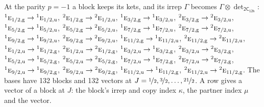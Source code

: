 \documentclass[10pt,a4paper]{article}
\numberwithin{equation}{section}
\newcommand{\grp}[1]{\mathsf{#1}}
\newcommand{\irr}[1]{\text{\normalfont\scshape #1}}
\newcommand{\conjpair}[1]{{}^{#1}}
\newcommand{\ptag}[1]{\mathrm{#1}}
\newcommand{\irrprod}{\otimes}
\newcommand{\mult}{\kappa}
\newcommand{\intx}{\mu}
\begin{document}
At the parity $p = -1$ a block keeps its kets, and its irrep $\Gamma$ becomes $\Gamma \irrprod \det_{\grp{2C_{12h}}}$: $\conjpair{1}\irr{e}_{1/2,\ptag{g}} \to \conjpair{1}\irr{e}_{1/2,\ptag{u}}$, $\conjpair{2}\irr{e}_{1/2,\ptag{g}} \to \conjpair{2}\irr{e}_{1/2,\ptag{u}}$, $\conjpair{1}\irr{e}_{3/2,\ptag{g}} \to \conjpair{1}\irr{e}_{3/2,\ptag{u}}$, $\conjpair{2}\irr{e}_{3/2,\ptag{g}} \to \conjpair{2}\irr{e}_{3/2,\ptag{u}}$, $\conjpair{1}\irr{e}_{5/2,\ptag{g}} \to \conjpair{1}\irr{e}_{5/2,\ptag{u}}$, $\conjpair{2}\irr{e}_{5/2,\ptag{g}} \to \conjpair{2}\irr{e}_{5/2,\ptag{u}}$, $\conjpair{1}\irr{e}_{7/2,\ptag{g}} \to \conjpair{1}\irr{e}_{7/2,\ptag{u}}$, $\conjpair{2}\irr{e}_{7/2,\ptag{g}} \to \conjpair{2}\irr{e}_{7/2,\ptag{u}}$, $\conjpair{1}\irr{e}_{9/2,\ptag{g}} \to \conjpair{1}\irr{e}_{9/2,\ptag{u}}$, $\conjpair{2}\irr{e}_{9/2,\ptag{g}} \to \conjpair{2}\irr{e}_{9/2,\ptag{u}}$, $\conjpair{1}\irr{e}_{11/2,\ptag{g}} \to \conjpair{1}\irr{e}_{11/2,\ptag{u}}$, $\conjpair{2}\irr{e}_{11/2,\ptag{g}} \to \conjpair{2}\irr{e}_{11/2,\ptag{u}}$, $\conjpair{1}\irr{e}_{1/2,\ptag{u}} \to \conjpair{1}\irr{e}_{1/2,\ptag{g}}$, $\conjpair{2}\irr{e}_{1/2,\ptag{u}} \to \conjpair{2}\irr{e}_{1/2,\ptag{g}}$, $\conjpair{1}\irr{e}_{3/2,\ptag{u}} \to \conjpair{1}\irr{e}_{3/2,\ptag{g}}$, $\conjpair{2}\irr{e}_{3/2,\ptag{u}} \to \conjpair{2}\irr{e}_{3/2,\ptag{g}}$, $\conjpair{1}\irr{e}_{5/2,\ptag{u}} \to \conjpair{1}\irr{e}_{5/2,\ptag{g}}$, $\conjpair{2}\irr{e}_{5/2,\ptag{u}} \to \conjpair{2}\irr{e}_{5/2,\ptag{g}}$, $\conjpair{1}\irr{e}_{7/2,\ptag{u}} \to \conjpair{1}\irr{e}_{7/2,\ptag{g}}$, $\conjpair{2}\irr{e}_{7/2,\ptag{u}} \to \conjpair{2}\irr{e}_{7/2,\ptag{g}}$, $\conjpair{1}\irr{e}_{9/2,\ptag{u}} \to \conjpair{1}\irr{e}_{9/2,\ptag{g}}$, $\conjpair{2}\irr{e}_{9/2,\ptag{u}} \to \conjpair{2}\irr{e}_{9/2,\ptag{g}}$, $\conjpair{1}\irr{e}_{11/2,\ptag{u}} \to \conjpair{1}\irr{e}_{11/2,\ptag{g}}$, $\conjpair{2}\irr{e}_{11/2,\ptag{u}} \to \conjpair{2}\irr{e}_{11/2,\ptag{g}}$.
The bases have 132 blocks and 132 vectors at $J = \nicefrac{1}{2}, \nicefrac{3}{2}, \dots, \nicefrac{21}{2}$. \label{n:index.copy}\label{n:head.vector}A row gives a vector of a block at $J$: the block's irrep and copy index $\mult$, the partner index $\intx$ and the vector.
\end{document}

